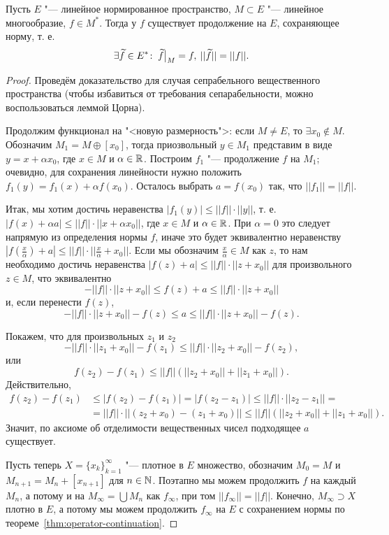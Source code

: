 \documentclass[main]{subfiles}
\begin{document}
\begin{theorem}
  Пусть \( E \) "--- линейное нормированное пространство,
  \( M \subset E \) "--- линейное многообразие,
  \( f \in M^* \).
  Тогда у \( f \) существует продолжение на \( E \), сохраняющее норму,
  т. е.
  \[
    \exists \widetilde{f} \in E^* \colon \:
    \widetilde{f} \bigr|_M = f, \:
    ||\widetilde{f}|| = ||f||.
  \]
\end{theorem}
\begin{proof}
  Проведём доказательство для случая
  сепрабельного вещественного пространства
  (чтобы избавиться от требования сепарабельности,
  можно воспользоваться леммой Цорна).

  Продолжим функционал на "<новую размерность">: если
  $M \ne E$, то $\exists x_0 \notin M$.
  Обозначим $M_1 = M \oplus [ x_0 ]$, тогда приозвольный \( y \in M_1 \)
  представим в виде $y = x + \alpha x_0$,
  где \( x \in M \) и \( \alpha \in \mathbb{R} \).
  Построим \( f_1 \) "--- продолжение \( f \) на \( M_1 \);
  очевидно, для сохранения линейности нужно положить
  $f_1(y) = f_1(x) + \alpha f(x_0)$.
  Осталось выбрать $a = f(x_0)$ так, что $||f_1|| = ||f||$.
  
  Итак, мы хотим достичь неравенства $|f_1(y)| \le ||f|| \cdot ||y||$,
  т. е. $|f(x) + \alpha a| \le ||f|| \cdot ||x + \alpha x_0||$,
  где $x \in M$ и $\alpha \in \mathbb{R}$.
  При \( \alpha = 0 \) это следует напрямую из определения нормы \( f \),
  иначе это будет эквивалентно неравенству
  $|f(\frac{x}{\alpha}) + a| \le ||f|| \cdot ||\frac{x}{\alpha} + x_0||$.
  Если мы обозначим $\frac{x}\alpha \in M$ как \( z \),
  то нам необходимо достичь неравенства $|f(z) + a| \le ||f|| \cdot ||z + x_0||$
  для произвольного $z \in M$, что эквивалентно
  \[ -||f|| \cdot ||z + x_0|| \le f(z) + a \le ||f|| \cdot ||z + x_0|| \]
  и, если перенести \( f(z) \),
  \[ -||f|| \cdot ||z + x_0|| - f(z) \le a \le ||f|| \cdot ||z + x_0|| - f(z). \]
  
  Покажем, что для произвольных $z_1$ и $z_2$
  \[
    -||f|| \cdot ||z_1 + x_0|| - f(z_1) \le ||f|| \cdot ||z_2 + x_0|| - f(z_2),
  \]
  или
  \[
    f(z_2) - f(z_1) \le ||f|| (||z_2 + x_0|| + ||z_1 + x_0||).
  \]
  Действительно,
  \begin{align}
    f(z_2) - f(z_1) &\le |f(z_2) - f(z_1)| = |f(z_2 - z_1)| \le ||f|| \cdot ||z_2 - z_1|| = \\
		    &= ||f|| \cdot ||(z_2 + x_0) - (z_1 + x_0)|| \le ||f|| (||z_2 + x_0|| + ||z_1 + x_0||).
  \end{align}
  Значит, по аксиоме об отделимости вещественных чисел подходящее \( a \) существует.

  Пусть теперь $X = \{ x_k \}_{k = 1}^\infty$ "--- плотное в $E$ множество,
  обозначим $M_0 = M$ и $M_{n + 1} = M_n + [x_{n+1}]$ для $n \in \mathbb{N}$.
  Поэтапно мы можем продолжить $f$ на каждый $M_n$, а потому и на
  $M_\infty = \bigcup M_n$ как $f_\infty$, при том $||f_\infty|| = ||f||$.
  Конечно, $M_\infty \supset X$ плотно в $E$, а потому мы можем продолжить
  $f_\infty$ на $E$ с сохранением нормы по
  теореме~\ref{thm:operator-continuation}.
\end{proof}
\end{document}
